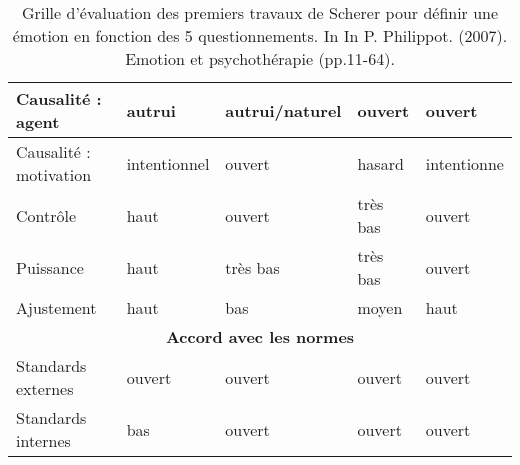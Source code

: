 \begin{table}[]
\begin{tabular}{|l|l|l|l|l|}
Causalité : agent                                     & autrui                                                     & autrui/naturel                                      & ouvert                                                   & ouvert                                              \\ \hline
Causalité : motivation                                & intentionnel                                               & ouvert                                              & hasard                                                   & intentionne                                         \\ \hline
Contrôle                                              & haut                                                       & ouvert                                              & très bas                                                 & ouvert                                              \\ \hline
Puissance                                             & haut                                                       & très bas                                            & très bas                                                 & ouvert                                              \\ \hline
Ajustement                                            & haut                                                       & bas                                                 & moyen                                                    & haut                                                \\ \hline
\multicolumn{5}{|c|}{\textbf{Accord avec les normes}}                                                                                                                                                                                                                                     \\ \hline
Standards externes                                    & ouvert                                                     & ouvert                                              & ouvert                                                   & ouvert                                              \\ \hline
Standards internes                                    & bas                                                        & ouvert                                              & ouvert                                                   & ouvert                                              \\ \hline
\end{tabular}
\label{tab:Scherer}
\caption{Grille d'évaluation des premiers travaux de Scherer pour définir une émotion en fonction des 5 questionnements. In In P. Philippot. (2007). Emotion et psychothérapie (pp.11-64).}
\end{table}
